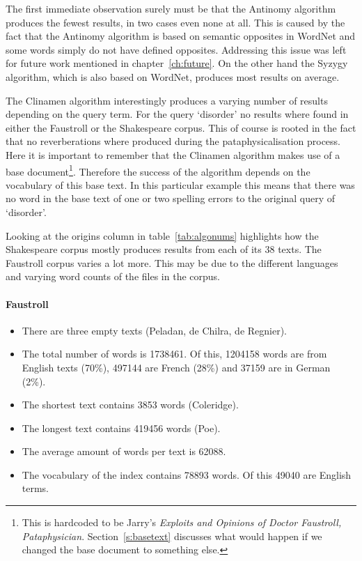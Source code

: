 The first immediate observation surely must be that the Antinomy algorithm produces the fewest results, in two cases even none at all. This is caused by the fact that the Antinomy algorithm is based on semantic opposites in WordNet and some words simply do not have defined opposites. Addressing this issue was left for future work mentioned in chapter~\ref{ch:future}. On the other hand the Syzygy algorithm, which is also based on WordNet, produces most results on average.

The Clinamen algorithm interestingly produces a varying number of results depending on the query term. For the query `disorder' no results where found in either the Faustroll or the Shakespeare corpus. This of course is rooted in the fact that no reverberations where produced during the pataphysicalisation process. Here it is important to remember that the Clinamen algorithm makes use of a base document\footnote{This is hardcoded to be Jarry's \textit{Exploits and Opinions of Doctor Faustroll, Pataphysician}. Section~\ref{s:basetext} discusses what would happen if we changed the base document to something else.}. Therefore the success of the algorithm depends on the vocabulary of this base text. In this particular example this means that there was no word in the base text of one or two spelling errors to the original query of `disorder'.

Looking at the origins column in table~\ref{tab:algonums} highlights how the Shakespeare corpus mostly produces results from each of its \num{38} texts. The Faustroll corpus varies a lot more. This may be due to the different languages and varying word counts of the files in the corpus.

\paragraph*{Faustroll}
\begin{itemize}
\vspace{-0.5cm}
  \item There are three empty texts (Peladan, de Chilra, de Regnier).
  \item The total number of words is \num{1738461}. Of this, \num{1204158} words are from English texts (70\%), \num{497144} are French (28\%) and \num{37159} are in German (2\%).
  \item The shortest text contains \num{3853} words (Coleridge).
  \item The longest text contains \num{419456} words (Poe).
  \item The average amount of words per text is \num{62088}.
  \item The vocabulary of the index contains \num{78893} words. Of this \num{49040} are English terms.
\end{itemize}

